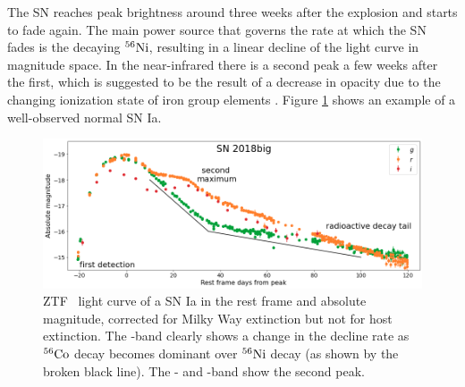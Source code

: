 \documentclass[a4paper,oneside,12pt, class=Latex/Classes/PhDthesisPSnPDF, crop=false]{standalone}
\begin{document}
The SN reaches peak brightness around three weeks after the explosion and starts to fade again. The main power source that governs the rate at which the SN fades is the decaying $^{56}\text{Ni}$, resulting in a linear decline of the light curve in magnitude space. In the near-infrared there is a second peak a few weeks after the first, which is suggested to be the result of a decrease in opacity due to the changing ionization state of iron group elements \citep{2nd_max}. Figure \ref{Ia-norm_example} shows an example of a well-observed normal SN Ia.

\begin{figure}
    \centering
    \includegraphics[width=\textwidth]{../Images/chapter_1/Ia-norm_example.png}
    \caption[Rest frame, absolute mangitude ZTF \ztfg\ztfr\ztfi\ light curve of a normal SN Ia.]{ZTF \ztfg\ztfr\ztfi\ light curve of a SN Ia in the rest frame and absolute magnitude, corrected for Milky Way extinction but not for host extinction. The \ztfg-band clearly shows a change in the decline rate as $^{56}\text{Co}$ decay becomes dominant over $^{56}\text{Ni}$ decay (as shown by the broken black line). The \ztfr- and \ztfi-band show the second peak.}
    \label{Ia-norm_example}
\end{figure}
\end{document}
